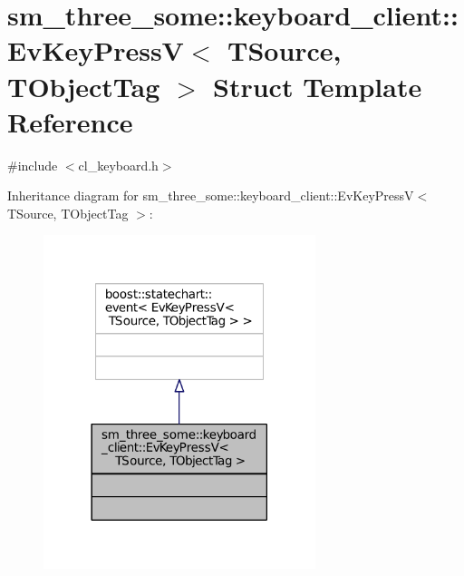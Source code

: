 \hypertarget{structsm__three__some_1_1keyboard__client_1_1EvKeyPressV}{}\section{sm\+\_\+three\+\_\+some\+:\+:keyboard\+\_\+client\+:\+:Ev\+Key\+PressV$<$ T\+Source, T\+Object\+Tag $>$ Struct Template Reference}
\label{structsm__three__some_1_1keyboard__client_1_1EvKeyPressV}


{\ttfamily \#include $<$cl\+\_\+keyboard.\+h$>$}



Inheritance diagram for sm\+\_\+three\+\_\+some\+:\+:keyboard\+\_\+client\+:\+:Ev\+Key\+PressV$<$ T\+Source, T\+Object\+Tag $>$\+:
\nopagebreak
\begin{figure}[H]
\begin{center}
\leavevmode
\includegraphics[width=225pt]{structsm__three__some_1_1keyboard__client_1_1EvKeyPressV__inherit__graph}
\end{center}
\end{figure}



